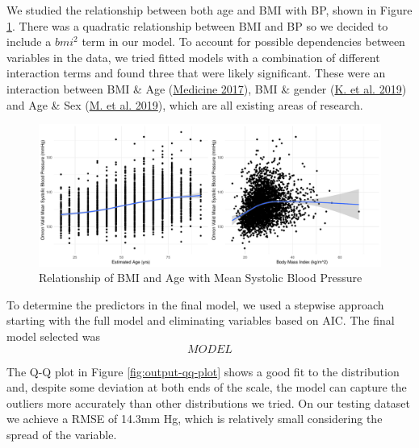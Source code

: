 \documentclass[
  11pt,
  twocolumn]{article}
\begin{document}
We studied the relationship between both age and BMI with BP, shown in
Figure \ref{fig:output-relationship-plots}. There was a quadratic
relationship between BMI and BP so we decided to include a \(bmi^2\)
term in our model. To account for possible dependencies between
variables in the data, we tried fitted models with a combination of
different interaction terms and found three that were likely
significant. These were an interaction between BMI \& Age
(\protect\hyperlink{ref-AgeBMI}{Medicine 2017}), BMI \& gender
(\protect\hyperlink{ref-SexBMI}{K. et al. 2019}) and Age \& Sex
(\protect\hyperlink{ref-AgeSex}{M. et al. 2019}), which are all existing
areas of research.

\begin{figure}[H]
\includegraphics{Coursework_files/figure-latex/output-relationship-plots-1} \caption{Relationship of BMI and Age with Mean Systolic Blood Pressure}\label{fig:output-relationship-plots}
\end{figure}

To determine the predictors in the final model, we used a stepwise
approach starting with the full model and eliminating variables based on
AIC. The final model selected was \[MODEL\]

The Q-Q plot in Figure \ref{fig:output-qq-plot} shows a good fit to the
distribution and, despite some deviation at both ends of the scale, the
model can capture the outliers more accurately than other distributions
we tried. On our testing dataset we achieve a RMSE of 14.3mm Hg, which
is relatively small considering the spread of the variable.
\end{document}
